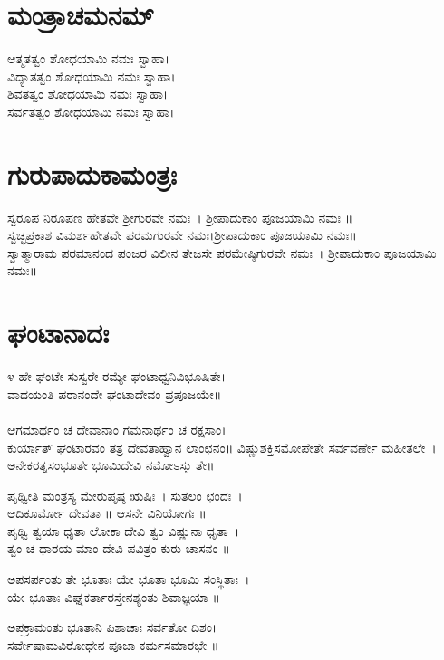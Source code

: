 \section{ಮಂತ್ರಾಚಮನಮ್}
 ಆತ್ಮತತ್ವಂ ಶೋಧಯಾಮಿ ನಮಃ ಸ್ವಾಹಾ।\\
 ವಿದ್ಯಾತತ್ವಂ ಶೋಧಯಾಮಿ ನಮಃ ಸ್ವಾಹಾ।\\
 ಶಿವತತ್ವಂ ಶೋಧಯಾಮಿ ನಮಃ ಸ್ವಾಹಾ।\\
 ಸರ್ವತತ್ವಂ ಶೋಧಯಾಮಿ ನಮಃ ಸ್ವಾಹಾ।
\section{ಗುರುಪಾದುಕಾಮಂತ್ರಃ}
 ಸ್ವರೂಪ ನಿರೂಪಣ ಹೇತವೇ ಶ್ರೀಗುರವೇ ನಮಃ~। ಶ್ರೀಪಾದುಕಾಂ ಪೂಜಯಾಮಿ ನಮಃ ॥\\
 ಸ್ವಚ್ಛಪ್ರಕಾಶ ವಿಮರ್ಶಹೇತವೇ ಪರಮಗುರವೇ ನಮಃ।ಶ್ರೀಪಾದುಕಾಂ ಪೂಜಯಾಮಿ ನಮಃ॥\\
 ಸ್ವಾತ್ಮಾರಾಮ ಪರಮಾನಂದ ಪಂಜರ ವಿಲೀನ ತೇಜಸೇ ಪರಮೇಷ್ಠಿಗುರವೇ ನಮಃ~। ಶ್ರೀಪಾದುಕಾಂ ಪೂಜಯಾಮಿ ನಮಃ॥
\section{ಘಂಟಾನಾದಃ}
೪ ಹೇ ಘಂಟೇ ಸುಸ್ವರೇ ರಮ್ಯೇ ಘಂಟಾಧ್ವನಿವಿಭೂಷಿತೇ।\\
ವಾದಯಂತಿ ಪರಾನಂದೇ ಘಂಟಾದೇವಂ ಪ್ರಪೂಜಯೇ॥\\
\\
ಆಗಮಾರ್ಥಂ ಚ ದೇವಾನಾಂ ಗಮನಾರ್ಥಂ ಚ ರಕ್ಷಸಾಂ।\\
ಕುರ್ಯಾತ್ ಘಂಟಾರವಂ ತತ್ರ ದೇವತಾಹ್ವಾನ ಲಾಂಛನಂ॥
\eject
ವಿಷ್ಣುಶಕ್ತಿಸಮೋಪೇತೇ ಸರ್ವವರ್ಣೇ ಮಹೀತಲೇ~।\\
ಅನೇಕರತ್ನಸಂಭೂತೇ ಭೂಮಿದೇವಿ ನಮೋಽಸ್ತು ತೇ॥

ಪೃಥ್ವೀತಿ ಮಂತ್ರಸ್ಯ ಮೇರುಪೃಷ್ಠ ಋಷಿಃ~। ಸುತಲಂ ಛಂದಃ~।\\ಆದಿಕೂರ್ಮೋ ದೇವತಾ ॥ ಆಸನೇ ವಿನಿಯೋಗಃ ॥\\
ಪೃಥ್ವಿ ತ್ವಯಾ ಧೃತಾ ಲೋಕಾ ದೇವಿ ತ್ವಂ ವಿಷ್ಣುನಾ ಧೃತಾ~।\\
ತ್ವಂ ಚ ಧಾರಯ ಮಾಂ ದೇವಿ ಪವಿತ್ರಂ ಕುರು ಚಾಸನಂ ॥

ಅಪಸರ್ಪಂತು ತೇ ಭೂತಾಃ ಯೇ ಭೂತಾ ಭೂಮಿ ಸಂಸ್ಥಿತಾಃ~।\\
ಯೇ ಭೂತಾಃ ವಿಘ್ನಕರ್ತಾರಸ್ತೇನಶ್ಯಂತು ಶಿವಾಜ್ಞಯಾ ॥

ಅಪಕ್ರಾಮಂತು ಭೂತಾನಿ ಪಿಶಾಚಾಃ ಸರ್ವತೋ ದಿಶಂ।\\
ಸರ್ವೇಷಾಮವಿರೋಧೇನ ಪೂಜಾ ಕರ್ಮಸಮಾರಭೇ ॥

